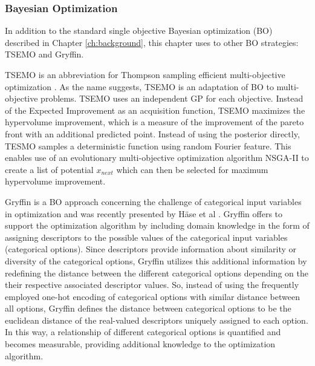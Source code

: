 \subsubsection{Bayesian Optimization}

In addition to the standard single objective Bayesian optimization (BO) described in Chapter \ref{ch:background}, this chapter uses to other BO strategies: TSEMO and Gryffin.

TSEMO is an abbreviation for Thompson sampling efficient multi-objective optimization \cite{Bradford2018}. As the name suggests, TSEMO is an adaptation of BO to multi-objective problems. TSEMO uses an independent GP for each objective. Instead of the Expected Improvement as an acquisition function, TSEMO maximizes the hypervolume improvement, which is a measure of the improvement of the pareto front with an additional predicted point. Instead of using the posterior directly, TESMO samples a deterministic function using random Fourier feature. This enables use of an evolutionary multi-objective optimization algorithm NSGA-II \cite{Deb2002} to create a list of potential $x_{next}$ which can then be selected for maximum hypervolume improvement.

Gryffin is a BO approach concerning the challenge of categorical input variables in optimization and was recently presented by H{\"{a}}se et al \cite{Hase2020a}. Gryffin offers to support the optimization algorithm by including domain knowledge in the form of assigning descriptors to the possible values of the categorical input variables (categorical options). Since descriptors provide information about similarity or diversity of the categorical options, Gryffin utilizes this additional information by redefining the distance between the different categorical options depending on the their respective associated descriptor values. So, instead of using the frequently employed one-hot encoding of categorical options with similar distance between all options,  Gryffin defines the distance between categorical options to be the euclidean distance of the real-valued descriptors uniquely assigned to each option. In this way, a relationship of different categorical options is quantified and becomes measurable, providing additional knowledge to the optimization algorithm. 


